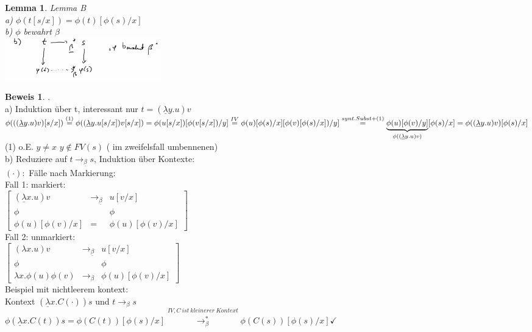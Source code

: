\documentclass{article}
\newtheorem{lemma}{Lemma}[section]
\theoremstyle{definition}
\newtheorem{beweis}{Beweis}[section]
\begin{document}
	\begin{lemma} Lemma B\\
	a) $\phi(t[s/x])=\phi(t)[\phi(s)/x]$\\
	b) $\phi$ bewahrt $\beta$\\
	\includegraphics[width=256px]{images/LemmaB.png}\\
	\end{lemma}

	\begin{beweis}. \\
	a) Induktion über t, interessant nur $t=(\underline{\lambda}y.u)v$\\
	$\phi(((\underline{\lambda}y.u)v)[s/x])\stackrel{(1)}{=}\phi((\underline{\lambda}y.u[s/x])v[s/x]) = \phi(u[s/x])[\phi(v[s/x])/y]\\
	\stackrel{IV}{=} \phi(u)[\phi(s)/x][\phi(v)[\phi(s)/x])/y]\\
	\stackrel{synt.Subst+(1)}{=} \underbrace{\phi(u)[\phi(v)/y]}_{\phi((\underline{\lambda}y.u)v)}[\phi(s)/x]\\
	= \phi((\underline{\lambda}y.u)v)[\phi(s)/x]$\\
	 (1) o.E. $y\neq x$ $y\notin FV(s)$ ( im zweifelsfall umbennenen)\\
	b) Reduziere auf $t\to_{\underline{\beta}} s$, Induktion über Kontexte:\\
	$(\cdot):$ Fälle nach Markierung:\\
	Fall 1: markiert:\\
	$\begin{bmatrix} (\underline{\lambda}x.u)v&\to_{\underline{\beta}}& u[v/x]\\
	\phi&&\phi\\
	\phi(u)[\phi(v)/x]&=&\phi(u)[\phi(v)/x]
	\end{bmatrix}$\\
	Fall 2: unmarkiert:\\
	$\begin{bmatrix} (\lambda x.u)v&\to_{\underline{\beta}}& u[v/x]\\
	\phi&&\phi\\
	\lambda x.\phi(u)\phi(v)&\to_\beta&\phi(u)[\phi(v)/x]
	\end{bmatrix}$\\
	Beispiel mit nichtleerem kontext:\\
	Kontext $(\underline{\lambda} x.C(\cdot))s$ und $t\to_\beta s$\\
	$\phi(\underline{\lambda} x.C(t))s = \phi(C(t))[\phi(s)/x]\stackrel{IV, C\ ist\ kleinerer\ Kontext}{\to_\beta^*}\phi(C(s))[\phi(s)/x]\checkmark$
	\end{beweis}
\end{document}
